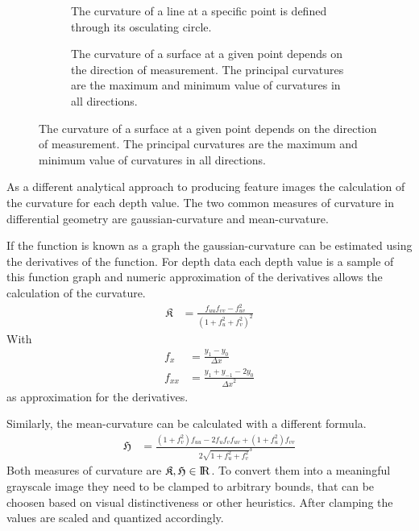 \begin{figure}[H]
    \begin{subfigure}[t]{0.47\textwidth}
        \scalebox{0.9}{%
        
        }
        \caption{The curvature of a line at a specific point is defined through its osculating circle.}
    \end{subfigure}
    \begin{subfigure}[t]{0.47\textwidth}
        \scalebox{0.9}{%
        
        }
        \caption{The curvature of a surface at a given point depends on the direction of measurement. The principal curvatures are the maximum and minimum value of curvatures in all directions.}
    \end{subfigure}
\end{figure}

As a different analytical approach to producing feature images the calculation of the \gls{curvature} for each depth value.
The two common measures of curvature in differential geometry are \gls{gaussian-curvature} and \gls{mean-curvature}\cite{Kuhnel2008}.

If the function is known as a graph the \Gls{gaussian-curvature} can be estimated using the derivatives of the function.
For depth data each depth value is a sample of this function graph and numeric approximation of the derivatives allows the calculation of the curvature.
\begin{align}
    \mathfrak{K} &= \frac{f_{uu} f_{vv} - f_{uv}^2}{{(1 + f_u^2 + f_v^2)}^2}
\end{align}
With
\begin{align*}
    f_{x} &= \frac{y_1 - y_0}{\Delta x} \\
    f_{xx} &= \frac{y_1 + y_{-1} - 2 y_0}{{\Delta x}^2}
\end{align*}
as approximation for the derivatives.

Similarly, the \Gls{mean-curvature} can be calculated with a different formula.
\begin{align}
    \mathfrak{H} &= \frac{{(1 + f_{v}^2)} f_{uu} - 2 f_u f_v f_{uv} + {(1 + f_u^2)} f_{vv}}{2 \sqrt{1 + f_u^2 + f_v^2}^3}
\end{align}
Both measures of curvature are $\mathfrak{K},\mathfrak{H} \in {\rm I\!R}$.
To convert them into a meaningful grayscale image they need to be clamped to arbitrary bounds, that can be choosen based on visual distinctiveness or other heuristics.
After clamping the values are scaled and quantized accordingly.

